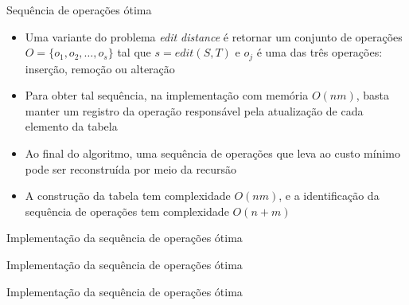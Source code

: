 \begin{frame}[fragile]{Sequência de operações ótima}

    \begin{itemize}
        \item Uma variante do problema {\it edit distance} é retornar um conjunto de operações
            $O = \lbrace o_1, o_2, \ldots, o_s\rbrace$ tal que $s = edit(S, T)$ e $o_j$ é uma
            das três operações: inserção, remoção ou alteração

        \item Para obter tal sequência, na implementação com memória $O(nm)$, basta manter um 
            registro da operação responsável pela atualização de cada elemento da tabela

        \item Ao final do algoritmo, uma sequência de operações que leva ao custo mínimo pode
            ser reconstruída por meio da recursão

        \item A construção da tabela tem complexidade $O(nm)$, e a identificação da sequência
            de operações tem complexidade $O(n + m)$
    \end{itemize}

\end{frame}

\begin{frame}[fragile]{Implementação da sequência de operações ótima}
\end{frame}

\begin{frame}[fragile]{Implementação da sequência de operações ótima}
\end{frame}

\begin{frame}[fragile]{Implementação da sequência de operações ótima}
\end{frame}
